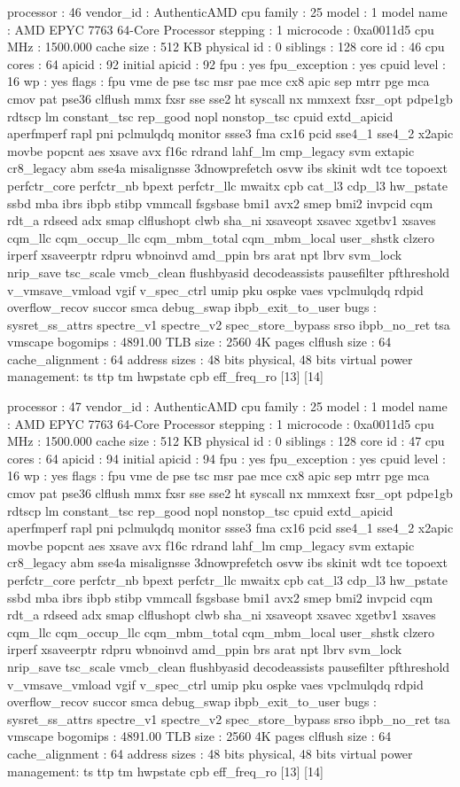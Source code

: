 processor	: 46
vendor_id	: AuthenticAMD
cpu family	: 25
model		: 1
model name	: AMD EPYC 7763 64-Core Processor
stepping	: 1
microcode	: 0xa0011d5
cpu MHz		: 1500.000
cache size	: 512 KB
physical id	: 0
siblings	: 128
core id		: 46
cpu cores	: 64
apicid		: 92
initial apicid	: 92
fpu		: yes
fpu_exception	: yes
cpuid level	: 16
wp		: yes
flags		: fpu vme de pse tsc msr pae mce cx8 apic sep mtrr pge mca cmov pat pse36 clflush mmx fxsr sse sse2 ht syscall nx mmxext fxsr_opt pdpe1gb rdtscp lm constant_tsc rep_good nopl nonstop_tsc cpuid extd_apicid aperfmperf rapl pni pclmulqdq monitor ssse3 fma cx16 pcid sse4_1 sse4_2 x2apic movbe popcnt aes xsave avx f16c rdrand lahf_lm cmp_legacy svm extapic cr8_legacy abm sse4a misalignsse 3dnowprefetch osvw ibs skinit wdt tce topoext perfctr_core perfctr_nb bpext perfctr_llc mwaitx cpb cat_l3 cdp_l3 hw_pstate ssbd mba ibrs ibpb stibp vmmcall fsgsbase bmi1 avx2 smep bmi2 invpcid cqm rdt_a rdseed adx smap clflushopt clwb sha_ni xsaveopt xsavec xgetbv1 xsaves cqm_llc cqm_occup_llc cqm_mbm_total cqm_mbm_local user_shstk clzero irperf xsaveerptr rdpru wbnoinvd amd_ppin brs arat npt lbrv svm_lock nrip_save tsc_scale vmcb_clean flushbyasid decodeassists pausefilter pfthreshold v_vmsave_vmload vgif v_spec_ctrl umip pku ospke vaes vpclmulqdq rdpid overflow_recov succor smca debug_swap ibpb_exit_to_user
bugs		: sysret_ss_attrs spectre_v1 spectre_v2 spec_store_bypass srso ibpb_no_ret tsa vmscape
bogomips	: 4891.00
TLB size	: 2560 4K pages
clflush size	: 64
cache_alignment	: 64
address sizes	: 48 bits physical, 48 bits virtual
power management: ts ttp tm hwpstate cpb eff_freq_ro [13] [14]

processor	: 47
vendor_id	: AuthenticAMD
cpu family	: 25
model		: 1
model name	: AMD EPYC 7763 64-Core Processor
stepping	: 1
microcode	: 0xa0011d5
cpu MHz		: 1500.000
cache size	: 512 KB
physical id	: 0
siblings	: 128
core id		: 47
cpu cores	: 64
apicid		: 94
initial apicid	: 94
fpu		: yes
fpu_exception	: yes
cpuid level	: 16
wp		: yes
flags		: fpu vme de pse tsc msr pae mce cx8 apic sep mtrr pge mca cmov pat pse36 clflush mmx fxsr sse sse2 ht syscall nx mmxext fxsr_opt pdpe1gb rdtscp lm constant_tsc rep_good nopl nonstop_tsc cpuid extd_apicid aperfmperf rapl pni pclmulqdq monitor ssse3 fma cx16 pcid sse4_1 sse4_2 x2apic movbe popcnt aes xsave avx f16c rdrand lahf_lm cmp_legacy svm extapic cr8_legacy abm sse4a misalignsse 3dnowprefetch osvw ibs skinit wdt tce topoext perfctr_core perfctr_nb bpext perfctr_llc mwaitx cpb cat_l3 cdp_l3 hw_pstate ssbd mba ibrs ibpb stibp vmmcall fsgsbase bmi1 avx2 smep bmi2 invpcid cqm rdt_a rdseed adx smap clflushopt clwb sha_ni xsaveopt xsavec xgetbv1 xsaves cqm_llc cqm_occup_llc cqm_mbm_total cqm_mbm_local user_shstk clzero irperf xsaveerptr rdpru wbnoinvd amd_ppin brs arat npt lbrv svm_lock nrip_save tsc_scale vmcb_clean flushbyasid decodeassists pausefilter pfthreshold v_vmsave_vmload vgif v_spec_ctrl umip pku ospke vaes vpclmulqdq rdpid overflow_recov succor smca debug_swap ibpb_exit_to_user
bugs		: sysret_ss_attrs spectre_v1 spectre_v2 spec_store_bypass srso ibpb_no_ret tsa vmscape
bogomips	: 4891.00
TLB size	: 2560 4K pages
clflush size	: 64
cache_alignment	: 64
address sizes	: 48 bits physical, 48 bits virtual
power management: ts ttp tm hwpstate cpb eff_freq_ro [13] [14]

